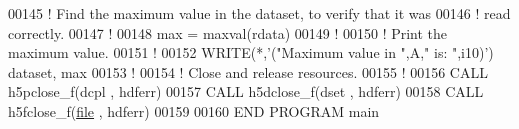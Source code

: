 \begin{DoxyCode}
00145   \textcolor{comment}{! Find the maximum value in the dataset, to verify that it was}
00146   \textcolor{comment}{! read correctly.}
00147   \textcolor{comment}{!}
00148   max = maxval(rdata)
00149   \textcolor{comment}{!}
00150   \textcolor{comment}{! Print the maximum value.}
00151   \textcolor{comment}{!}
00152   \textcolor{keyword}{WRITE}(*,\textcolor{stringliteral}{'("Maximum value in ",A," is: ",i10)'}) dataset, max
00153   \textcolor{comment}{!}
00154   \textcolor{comment}{! Close and release resources.}
00155   \textcolor{comment}{!}
00156   \textcolor{keyword}{CALL }h5pclose\_f(dcpl , hdferr)
00157   \textcolor{keyword}{CALL }h5dclose\_f(dset , hdferr)
00158   \textcolor{keyword}{CALL }h5fclose\_f(\hyperlink{structfile}{file} , hdferr)
00159 
00160 \textcolor{keyword}{END PROGRAM }main
\end{DoxyCode}

